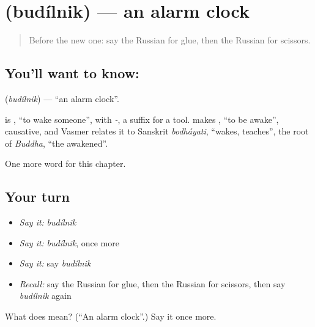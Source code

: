 \section[\texorpdfstring{\ru{будильник} (budílnik)}{будильник (budílnik)}]{ (budílnik) — an alarm clock}

\label{lesson:RU-C99-alarm-clock}



\begin{quote}
Before the new one: say the Russian for glue, then the Russian for scissors.
\end{quote}

\subsection*{You'll want to know: }
\textbf{} (\emph{budílnik}) — \textquotedblleft{}an alarm clock\textquotedblright{}.

\begin{cousinweb}
\textbf{} is \emph{}, \textquotedblleft{}to wake someone\textquotedblright{}, with \emph{-}, a suffix for a tool. \emph{} makes \emph{}, \textquotedblleft{}to be awake\textquotedblright{}, causative, and Vasmer relates it to Sanskrit \emph{bodháyati}, \textquotedblleft{}wakes, teaches\textquotedblright{}, the root of \emph{Buddha}, \textquotedblleft{}the awakened\textquotedblright{}.
\end{cousinweb}

\begin{grammarlens}[title={What you've built}]
One more word for this chapter.
\end{grammarlens}

\subsection*{Your turn}
\begin{itemize}
\raggedright
  \item \emph{Say it:} \emph{budílnik}
  \item \emph{Say it:} \emph{budílnik}, once more
  \item \emph{Say it:} say \emph{budílnik}
  \item \emph{Recall:} say the Russian for glue, then the Russian for scissors, then say \emph{budílnik} again
\end{itemize}

\begin{tcolorbox}[breakable,colback=teal!4,colframe=teal!35!black,title={Before you move on}]
What does  mean? (\textquotedblleft{}An alarm clock\textquotedblright{}.) Say it once more.
\end{tcolorbox}
